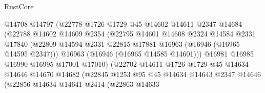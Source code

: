 \begin{lexlean}{RustCore}
\begin{coremodule}
                                @14708
                                @14797
                                (@22778
                                  @1726
                                  @1729
                                  @45
                                  @14602
                                  @14611
                                  @2347
                                  @14684
                                  (@22788
                                    @14602
                                    @14609
                                    @2354
                                    (@22795
                                      @14601
                                      @14608
                                      @2324
                                      @14584
                                      @2331
                                      @17840
                                      (@22809
                                        @14594
                                        @2331
                                        @22815
                                        @17881
                                        @16963
                                        (@16946 (@16965 @14595 @2347)))
                                      @16963
                                      (@16946 (@16965 @14585 @14601)))
                                    @16981
                                    @16985
                                    @16990
                                    @16995
                                    @17001
                                    @17010)
                                  (@22702
                                    @14611
                                    @1726
                                    @1729
                                    @45
                                    @14634
                                    @14646
                                    @14670
                                    @14682
                                    (@22845
                                      @1253
                                      @95
                                      @45
                                      @14634
                                      @14643
                                      @2347
                                      @14646
                                      (@22856
                                        @14634
                                        @14641
                                        @2414
                                        (@22863
                                          @14633

\end{coremodule}
\end{lexlean}
